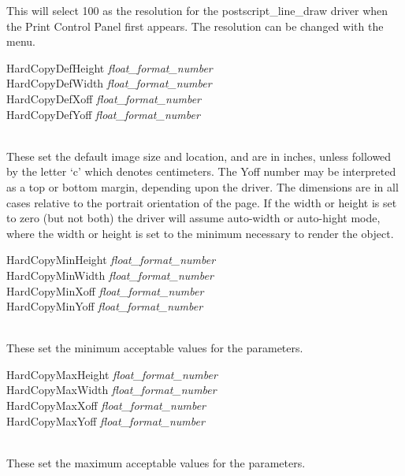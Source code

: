 \begin{description}
This will select 100 as the resolution for the {\vt
postscript\_line\_draw} driver when the {\cb Print Control Panel}
first appears.  The resolution can be changed with the menu.

\item\parbox[b]{4in}{\vt
HardCopyDefHeight {\it float\_format\_number}\\
HardCopyDefWidth {\it float\_format\_number}\\
HardCopyDefXoff {\it float\_format\_number}\\
HardCopyDefYoff {\it float\_format\_number}}\\
These set the default image size and location, and are in inches,
unless followed by the letter `c' which denotes centimeters.  The {\vt
Yoff} number may be interpreted as a top or bottom margin, depending
upon the driver.  The dimensions are in all cases relative to the
portrait orientation of the page.  If the width or height is set to
zero (but not both) the driver will assume auto-width or auto-hight
mode, where the width or height is set to the minimum necessary to
render the object.

\item\parbox[b]{4in}{\vt
HardCopyMinHeight {\it float\_format\_number}\\
HardCopyMinWidth {\it float\_format\_number}\\
HardCopyMinXoff {\it float\_format\_number}\\
HardCopyMinYoff {\it float\_format\_number}}\\
These set the minimum acceptable values for the parameters.

\item\parbox[b]{4in}{\vt
HardCopyMaxHeight {\it float\_format\_number}\\
HardCopyMaxWidth {\it float\_format\_number}\\
HardCopyMaxXoff {\it float\_format\_number}\\
HardCopyMaxYoff {\it float\_format\_number}}\\
These set the maximum acceptable values for the parameters.
\end{description}


